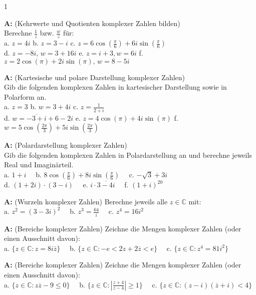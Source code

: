 \documentclass[landscape,twocolumn,a4paper]{article}
\begin{document}
\newcommand\x{1}
\setcounter {y} {1}

\parindent 0mm

\bigskip

\textbf{A:} (Kehrwerte und Quotienten komplexer Zahlen bilden) \\
Berechne $\frac{1}{z}$ bzw. $\frac{w}{z}$ für: \\
a. $z = 4 i$  \quad    b. $z = 3 - i$  \quad c. $z = 6\cos(\frac{\pi}{6}) + 6 i \sin(\frac{\pi}{6}) $  \\
d. $z = -8 i, \, w = 3 + 16i$ \quad e. $z=i+3, w=6i$ \quad f. $z = 2\cos(\pi) + 2 i \sin(\pi), \, w = 8- 5i$
\bigskip {}

\textbf{A:} (Kartesische und polare Darstellung komplexer Zahlen) \\
Gib die folgenden komplexen Zahlen in kartesischer Darstellung sowie in Polarform an.\\
a. $z = 3$  \quad    b. $w = 3 + 4i$  \quad c. $z = \frac{1}{2 + i} $  \\
d. $w = \overline{-3+i}+6-2i$ \quad e. $z = 4\cos(\pi) + 4i \sin(\pi) $ \quad f. $w = 5 \cos(\frac{2\pi}{3}) +
5i \sin(\frac{2\pi}{3})$ 
\bigskip {}

\textbf{A:} (Polardarstellung komplexer Zahlen) \\
Gib die folgenden komplexen Zahlen in Polardarstellung an und berechne jeweils Real und Imaginärteil. \\
a. $1 + i \quad$     b. $8 \cos(\frac{\pi}{6}) + 8 i \sin(\frac{\pi}{6}) \quad$  c. $ -\sqrt{3} + 3 i $  \\
d. $ (1 + 2i) \cdot (3 - i) \quad$   e. $ i \cdot \overline{3 - 4 i} \quad$ f. $(1 + i)^{20}$ 
\bigskip {}

\textbf{A:} (Wurzeln komplexer Zahlen)  
Berechne jeweils alle $z \in \mathbb{C}$ mit:\\
a. $z^2 = ( 3- 3i)^2 \quad$     b. $z^3 = \frac{64}{i} \quad $  c. $ z^4 = 16i^2 $ 
\bigskip {}

\textbf{A:} (Bereiche komplexer Zahlen)  
Zeichne die Mengen komplexer Zahlen (oder einen Ausschnitt davon):\\
a. $\{z \in \mathbb{C} : z = 8i\overline{z} \} \quad $ 
b. $\{z \in \mathbb{C} : -e < 2z+2\overline{z} < e \} \quad $ 
c. $\{z \in \mathbb{C} :  z^4 = 81 i^2 \}  $ 
\bigskip {}

\textbf{A:} (Bereiche komplexer Zahlen)  
Zeichne die Mengen komplexer Zahlen (oder einen Ausschnitt davon):\\
a. $\{z \in \mathbb{C} : z \overline{z} - 9 \le 0 \} \quad $ 
b. $\{z \in \mathbb{C} : \left| \frac{z+4}{z-4}  \right| \ge 1 \} \quad $ 
c. $\{z \in \mathbb{C} :  (z-i)(\overline{z}+i) < 4\}  $ 
\bigskip {}
\end{document}
